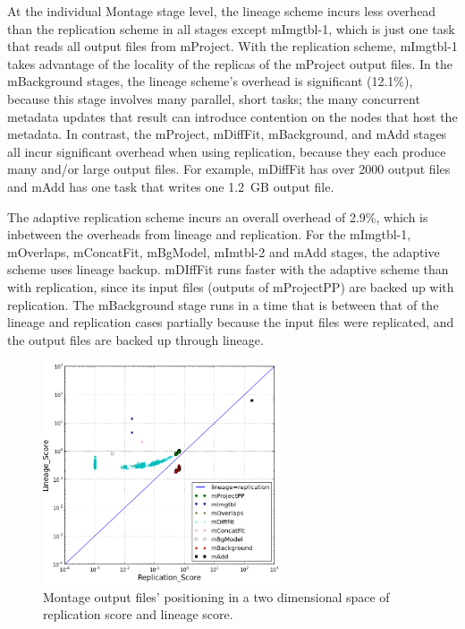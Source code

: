 \documentclass{sig-alternate}
\begin{document}
At the individual Montage stage level, the lineage scheme incurs less overhead than the replication scheme in all stages except mImgtbl-1,
which is just one task that reads all output files from mProject.
With the replication scheme, mImgtbl-1 takes advantage of the locality of the replicas of the mProject output files.
In the mBackground stages, the lineage scheme's overhead is significant (12.1\%), because this stage involves many
parallel, short tasks; the many concurrent metadata updates that result can introduce contention on the nodes that host the metadata.
In contrast, the mProject, mDiffFit, mBackground, and mAdd stages all incur significant overhead when using replication, because they each produce many and/or large output files.
For example, mDiffFit has over 2000 output files and mAdd has one task that writes one 1.2~GB output file.

The adaptive replication scheme incurs an overall overhead of 2.9\%, which is inbetween the overheads from lineage and replication.
For the mImgtbl-1, mOverlaps, mConcatFit, mBgModel, mImtbl-2 and mAdd stages, the adaptive
scheme uses lineage backup.
mDIffFit runs faster with the adaptive scheme than with replication, since its input files (outputs of mProjectPP) are backed up with replication.
The mBackground stage runs in a time that is between that of the lineage and replication cases partially because the input files
were replicated, and the output files are backed up through lineage.


\begin{figure}[ht]
        \begin{center}
                \includegraphics[width=70mm]{pictures/dist}
                \vspace{-10pt}
                \caption{Montage output files' positioning in a two dimensional space of replication score and lineage score.
                \label{fig:montage-space}}
        \end{center}
\end{figure}
\end{document}
